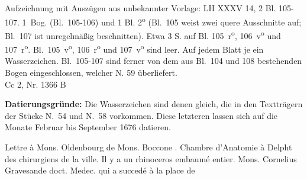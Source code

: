 \begin{ledgroupsized}[r]{114mm}%
\footnotesize%
\pstart \parindent -6mm%
%
Aufzeichnung mit Auszügen aus unbekannter Vorlage: LH XXXV 14, 2 Bl. 105-107.
1~Bog. (Bl.~105-106) und 1 Bl. 2\textsuperscript{o}
(Bl.~105 weist zwei quere Ausschnitte auf;
Bl.~107 ist unregelmäßig beschnitten).
Etwa 3 S. auf Bl. 105~r\textsuperscript{o}, 106~v\textsuperscript{o} und 107~r\textsuperscript{o}.
Bl.~105~v\textsuperscript{o}, 106~r\textsuperscript{o} und 107~v\textsuperscript{o} sind leer.
Auf jedem Blatt je ein Wasserzeichen.
Bl.~105-107 sind ferner von dem aus Bl.~104 und 108 bestehenden Bogen eingeschlossen, welcher N. 59 %
überliefert.\\%
Cc 2, Nr. 1366 B%
\pend%
\end{ledgroupsized}%
\vspace*{5mm}%
\begin{ledgroup}%
\footnotesize%
\pstart%
\noindent%
\footnotesize{\textbf{Datierungsgr\"{u}nde:}
Die Wasserzeichen sind denen gleich, die in den Textträgern der Stücke N.~54 und N.~58 vorkommen.
Diese letzteren lassen sich auf die Monate Februar bis September 1676 datieren.
}%
\pend%
\end{ledgroup}%
\vspace*{8mm}%
\count{}
\count{}
\count{}
\pstart%
\normalsize
\noindent%
[105~r\textsuperscript{o}]
Lettre \`{a} Mons. Oldenbourg\protect{} de Mons. Boccone\protect{} . Chambre d'Anatomie \`{a} Delpht\protect{} des chirurgiens de la ville. Il y a un rhinoceros embaum\'{e} entier. Mons. Cornelius Gravesande\protect{} doct. Medec. qui a succed\'{e} \`{a} la place de
